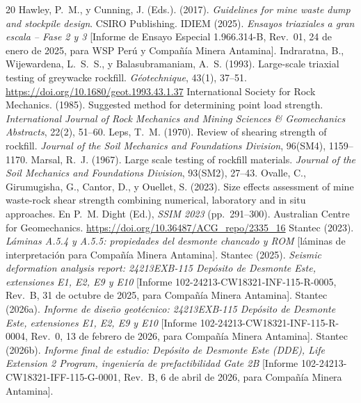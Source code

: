 \documentclass[11pt,letterpaper]{article}
\begin{document}
\begin{thebibliography}{20}
 Hawley, P.~M., y Cunning, J. (Eds.). (2017). \emph{Guidelines for mine waste dump and stockpile design}. CSIRO Publishing.
 IDIEM (2025). \emph{Ensayos triaxiales a gran escala -- Fase 2 y 3} [Informe de Ensayo Especial 1.966.314-B, Rev.~01, 24 de enero de 2025, para WSP Perú y Compañía Minera Antamina].
 Indraratna, B., Wijewardena, L.~S.~S., y Balasubramaniam, A.~S. (1993). Large-scale triaxial testing of greywacke rockfill. \emph{Géotechnique}, 43(1), 37--51. \url{https://doi.org/10.1680/geot.1993.43.1.37}
 International Society for Rock Mechanics. (1985). Suggested method for determining point load strength. \emph{International Journal of Rock Mechanics and Mining Sciences \& Geomechanics Abstracts}, 22(2), 51--60.
 Leps, T.~M. (1970). Review of shearing strength of rockfill. \emph{Journal of the Soil Mechanics and Foundations Division}, 96(SM4), 1159--1170.
 Marsal, R.~J. (1967). Large scale testing of rockfill materials. \emph{Journal of the Soil Mechanics and Foundations Division}, 93(SM2), 27--43.
 Ovalle, C., Girumugisha, G., Cantor, D., y Ouellet, S. (2023). Size effects assessment of mine waste-rock shear strength combining numerical, laboratory and in situ approaches. En P.~M. Dight (Ed.), \emph{SSIM 2023} (pp.~291--300). Australian Centre for Geomechanics. \url{https://doi.org/10.36487/ACG_repo/2335_16}
 Stantec (2023). \emph{Láminas A.5.4 y A.5.5: propiedades del desmonte chancado y ROM} [láminas de interpretación para Compañía Minera Antamina].
 Stantec (2025). \emph{Seismic deformation analysis report: 24213EXB-115 Depósito de Desmonte Este, extensiones E1, E2, E9 y E10} [Informe 102-24213-CW18321-INF-115-R-0005, Rev.~B, 31 de octubre de 2025, para Compañía Minera Antamina].
 Stantec (2026a). \emph{Informe de diseño geotécnico: 24213EXB-115 Depósito de Desmonte Este, extensiones E1, E2, E9 y E10} [Informe 102-24213-CW18321-INF-115-R-0004, Rev.~0, 13 de febrero de 2026, para Compañía Minera Antamina].
 Stantec (2026b). \emph{Informe final de estudio: Depósito de Desmonte Este (DDE), Life Extension 2 Program, ingeniería de prefactibilidad Gate 2B} [Informe 102-24213-CW18321-IFF-115-G-0001, Rev.~B, 6 de abril de 2026, para Compañía Minera Antamina].

\end{thebibliography}
\end{document}
